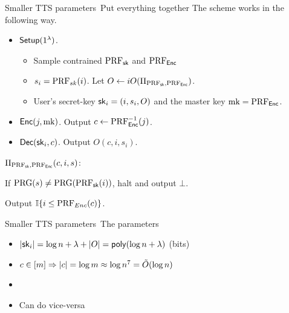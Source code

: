 \begin{frame}{Smaller TTS parameters~\cite{conf/tcc/KowalczykMUZ16}}{Put
    everything together}
The scheme works in the following way.
\begin{itemize}
\item $\mathsf{Setup}(1^\lambda)$.
  \begin{itemize}
  \item Sample contrained $\mathrm{PRF}_{\mathsf{sk}}$ and $\mathrm{PRF}_{\mathsf{Enc}}$
  \item $s_i = \mathrm{PRF}_{sk}(i)$. Let $O \leftarrow iO(\Pi_{\mathrm{PRF}_{\mathsf{sk}}, \mathrm{PRF}_{\mathsf{Enc}}})$.
  \item User's secret-key $\mathsf{sk}_i = (i, s_i, O)$ and the master key $\mathrm{mk}=\mathrm{PRF}_{\mathsf{Enc}}$.
\end{itemize}

\item $\mathsf{Enc}(j, \mathrm{mk})$. Output $c \leftarrow \mathrm{PRF}^{-1}_{\mathsf{Enc}}(j)$.
\item $\mathsf{Dec}(\mathsf{sk}_i, c)$. Output $O(c,i,s_i)$.
\end{itemize}

\begin{tcolorbox}[colframe=gray,colback=gray!30]
$\Pi_{\mathrm{PRF}_{\mathsf{sk}}, \mathrm{PRF}_{\mathsf{Enc}}}(c,i,s)$:

\hspace{1em} If $\mathrm{PRG}(s) \neq \mathrm{PRG}(\mathrm{PRF}_{\mathsf{sk}}(i))$, halt and output $\bot$.

\hspace{1em} Output $\mathbb{I}\{i \leq \mathrm{PRF}_{Enc}(c) \}$.
\end{tcolorbox}
\end{frame}


\begin{frame}{Smaller TTS parameters~\cite{conf/tcc/KowalczykMUZ16}}{The parameters}
\begin{itemize}
\item $|\mathsf{sk}_i| = \log n + \lambda +|O| = \mathsf{poly}(\log n + \lambda)$ (bits)
\item $c \in [m] \Rightarrow |c| = \log m \approx \log n^7 = \tilde{O}(\log n)$
\item {} \qquad {}
\item Can do vice-versa
\end{itemize}
\end{frame}


